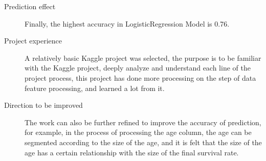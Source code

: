 \documentclass{tikzposter} %
\begin{document}
\begin{columns}
{}


{
\begin{description}
  \item[Prediction effect]
  Finally, the highest accuracy in LogisticRegression Model is 0.76.

  \item[Project experience]
	A relatively basic Kaggle project was selected, the purpose is to be familiar with the
	Kaggle project, deeply analyze and understand each line of the project process, this
	project has done more processing on the step of data feature processing, and learned
	a lot from it.

  \item[Direction to be improved]
  The work can also be further refined to improve the accuracy of prediction, for
  example, in the process of processing the age column, the age can be segmented
  according to the size of the age, and it is felt that the size of the age has a certain
  relationship with the size of the final survival rate.
\end{description}
}

\end{columns}



\end{document}
